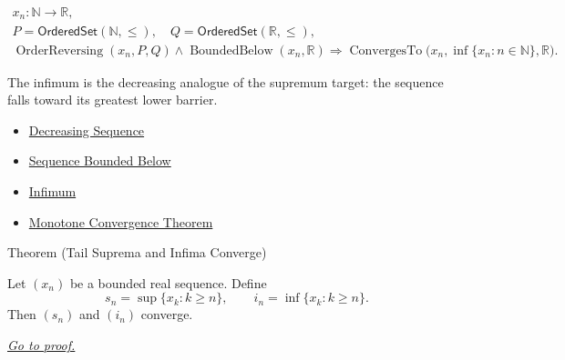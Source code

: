 \begin{remark*}
\[
\begin{gathered}
x_n\colon\mathbb{N}\to\mathbb{R},\\
P=\mathsf{OrderedSet}(\mathbb{N},\leq),\quad
Q=\mathsf{OrderedSet}(\mathbb{R},\leq),\\
\operatorname{OrderReversing}(x_n,P,Q)
\land
\operatorname{BoundedBelow}(x_n,\mathbb{R})
\Longrightarrow
\operatorname{ConvergesTo}\bigl(x_n,\inf\{x_n:n\in\mathbb{N}\},\mathbb{R}\bigr).
\end{gathered}
\]
\end{remark*}

\begin{remark*}[Interpretation]
The infimum is the decreasing analogue of the supremum target: the sequence
falls toward its greatest lower barrier.
\end{remark*}

\begin{dependencies}
\begin{itemize}
  \item \hyperref[def:decreasing-sequence]{Decreasing Sequence}
  \item \hyperref[def:sequence-bounded-below]{Sequence Bounded Below}
  \item \hyperref[def:infimum]{Infimum}
  \item \hyperref[thm:monotone-convergence-theorem]{Monotone Convergence Theorem}
\end{itemize}
\end{dependencies}


\begin{theorembox}{Theorem (Tail Suprema and Infima Converge)}
\begin{theorem}
\label{thm:tail-suprema-infima-converge}
Let $(x_n)$ be a bounded real sequence. Define
\[
  s_n=\sup\{x_k:k\ge n\},
  \qquad
  i_n=\inf\{x_k:k\ge n\}.
\]
Then $(s_n)$ and $(i_n)$ converge.

\smallskip
\noindent
\hyperref[prf:tail-suprema-infima-converge]{\textit{Go to proof.}}
\end{theorem}
\end{theorembox}

